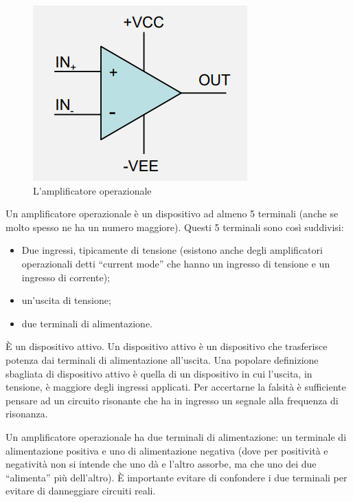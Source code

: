 \documentclass{article}
\begin{document}
\begin{figure}[h]
  \centering
  \includegraphics[scale=0.7]{IM_amplificatore_operazionale}
  \caption{L'amplificatore operazionale}
  \label{Schema_amplificatore_operazionale}
\end{figure}

Un amplificatore operazionale è un dispositivo ad almeno 5 terminali (anche se molto spesso ne ha un numero maggiore). Questi 5 terminali sono così suddivisi:
\begin{itemize}
  \item Due ingressi, tipicamente di tensione (esistono anche degli amplificatori operazionali detti ``current mode'' che hanno un ingresso di tensione e un ingresso di corrente);
  \item un'uscita di tensione;
  \item  due terminali di alimentazione.
\end{itemize}

\vspace{3mm}

È un dispositivo attivo. Un dispositivo attivo è un dispositivo che trasferisce potenza dai terminali di alimentazione all'uscita. Una popolare definizione sbagliata di dispositivo attivo è quella di un dispositivo in cui l'uscita, in tensione, è maggiore degli ingressi applicati. Per accertarne la falsità è sufficiente pensare ad un circuito risonante che ha in ingresso un segnale alla frequenza di risonanza.

\vspace{3mm}

Un amplificatore operazionale ha due terminali di alimentazione: un terminale di alimentazione positiva e uno di alimentazione negativa (dove per positività e negatività non si intende che uno dà e l'altro assorbe, ma che uno dei due ``alimenta'' più dell'altro). È importante evitare di confondere i due terminali per evitare di danneggiare circuiti reali.
\end{document}
